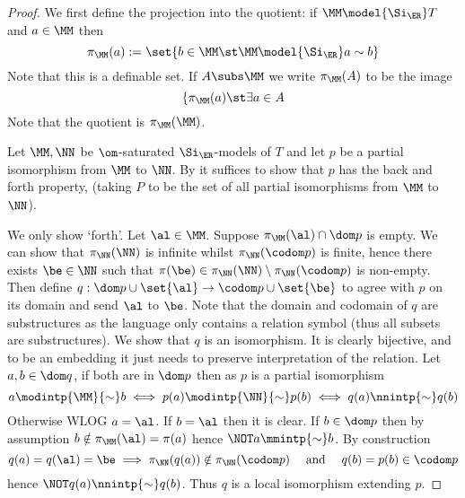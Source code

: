 \begin{proof}
    We first define the projection into the quotient:
    if $\MM \model{\Si_\ER} T$ and $a \in {\MM}$ then 
    \[\pi_\MM(a) := \set{b \in {\MM} \st \MM \model{\Si_\ER} a \sim b}\]
    Note that this is a definable set.
    If $A \subs \MM$ we write $\pi_\MM(A)$ to be the image
    \[\{\pi_\MM(a) \st \exists a \in A\]
    Note that the quotient is $\pi_\MM(\MM)$.

    Let $\MM, \NN$ be $\om$-saturated $\Si_\ER$-models of $T$
    and let $p$ be a partial isomorphism from $\MM$ to $\NN$.
    By 
    it suffices to show that $p$ has the back and forth property,
    (taking $P$ to be the set of all partial isomorphisms from $\MM$ to $\NN$).
    
    We only show `forth'.
    Let $\al \in \MM$.
    Suppose $\pi_\MM(\al) \cap \dom p$ is empty.
    We can show that $\pi_\NN(\NN)$ is infinite whilst 
    $\pi_\NN(\codom p)$ is finite, 
    hence there exists $\be \in \NN$ such that 
    $\pi(\be) \in \pi_\NN(\NN) \setminus \pi_\NN(\codom p)$ is non-empty.
    Then define $q : \dom p \cup \set{\al} \to \codom p \cup \set{\be}$
    to agree with $p$ on its domain and send $\al$ to $\be$.
    Note that the domain and codomain of $q$ are substructures
    as the language only contains a relation symbol 
    (thus all subsets are substructures).
    We show that $q$ is an isomorphism.
    It is clearly bijective, and to be an embedding it just needs to preserve
    interpretation of the relation.
    Let $a,b \in \dom q$, if 
    both are in $\dom p$ then as $p$ is a partial isomorphism
    \[a \modintp{\MM}{\sim} b \iff p(a) \modintp{\NN}{\sim} p(b) \iff 
    q(a) \nnintp{\sim} q(b)\]
    Otherwise WLOG $a = \al$.
    If $b = \al$ then it is clear.
    If $b \in \dom p$ then by assumption $b \notin \pi_\MM(\al) = \pi(a)$
    hence $\NOT a \mmintp{\sim} b$.
    By construction 
    \[q(a) = q(\al) = \be \implies 
    \pi_\NN(q(a)) \notin \pi_\NN(\codom p) \quad \text{ and } \quad
    q(b) = p(b) \in \codom p\]
    hence $\NOT q(a) \nnintp{\sim} q(b)$.
    Thus $q$ is a local isomorphism extending $p$.


\end{proof}
